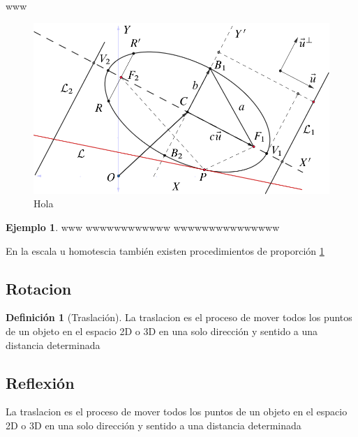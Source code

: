 \documentclass[
  16pt,
]{krantz}
\theoremstyle{definition}
\newtheorem{definition}{Definición}[chapter]
\theoremstyle{definition}
\newtheorem{example}{Ejemplo}[chapter]
\theoremstyle{definition}
\theoremstyle{definition}
\theoremstyle{remark}
\begin{document}
www

\begin{figure}

{\centering \includegraphics{elipse} 

}

\caption{Hola}\label{fig:Doge}
\end{figure}

\begin{example}
\protect\hypertarget{exm:unnamed-chunk-3}{}\label{exm:unnamed-chunk-3}www wwwwwwwwwwww wwwwwwwwwwwwwww
\end{example}

En la escala u homotescia también existen procedimientos de proporción \ref{fig:Doge}

\hypertarget{rotacion}{%
\subsection{Rotacion}\label{rotacion}}

\begin{definition}[Traslación]
\protect\hypertarget{def:rotacion}{}\label{def:rotacion}La traslacion es el proceso de mover todos los puntos de un objeto en el espacio 2D o 3D en una solo dirección y sentido a una distancia determinada
\end{definition}

\hypertarget{reflexiuxf3n}{%
\subsection{Reflexión}\label{reflexiuxf3n}}

La traslacion es el proceso de mover todos los puntos de un objeto en el espacio 2D o 3D en una solo dirección y sentido a una distancia determinada
\end{document}
